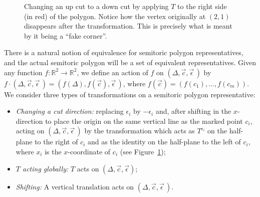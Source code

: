 \documentclass[10pt,a4paper]{amsart}
\numberwithin{equation}{section}
\def\R{{\mathbb R}}
\newcommand{\De}{\Delta}
\newcommand{\strep}{(\De,\vec{c},\vec{\epsilon}\,)}
\theoremstyle{definition}
\theoremstyle{plain}
\theoremstyle{plain}
\begin{document}
 \begin{figure}
 \centering
 \caption{Changing an up cut to a down cut by applying $T$ to the right side (in red) of the polygon. Notice how the vertex originally at $(2,1)$ disappears after the transformation. This is precisely what is meant by it being a ``fake corner''.} \label{fig:change-cut}
 \end{figure}


There is a natural notion of equivalence for semitoric polygon representatives, and the actual semitoric polygon will be a set of equivalent representatives.
Given any function $f\colon \R^2\to \R^2$, we define an action of $f$ on $\strep$ by $f\cdot \strep = (f(\Delta),f(\vec{c}), \vec{\epsilon}\,)$,
where $f(\vec{c}) = (f(c_1), \ldots, f(c_m))$.
We consider three types of transformations on a semitoric polygon representative:
\begin{itemize}\itemsep=0pt
 \item \emph{Changing a cut direction:} replacing $\epsilon_i$ by $-\epsilon_i$ and, after shifting in the $x$-direction to place the origin on the same vertical line as the marked point $c_i$, acting on $\strep$ by the transformation which acts as $T^{\epsilon_i}$ on the half-plane to the right of $c_i$
 and as the identity on the half-plane to the left of $c_i$, where $x_i$ is the $x$-coordinate of $c_i$ (see Figure~\ref{fig:change-cut});
 \item \emph{$T$ acting globally:} $T$ acts on $(\Delta, \vec c, \vec\epsilon)$;
 \item \emph{Shifting:} A vertical translation acts on $\strep$.
\end{itemize}
\end{document}

